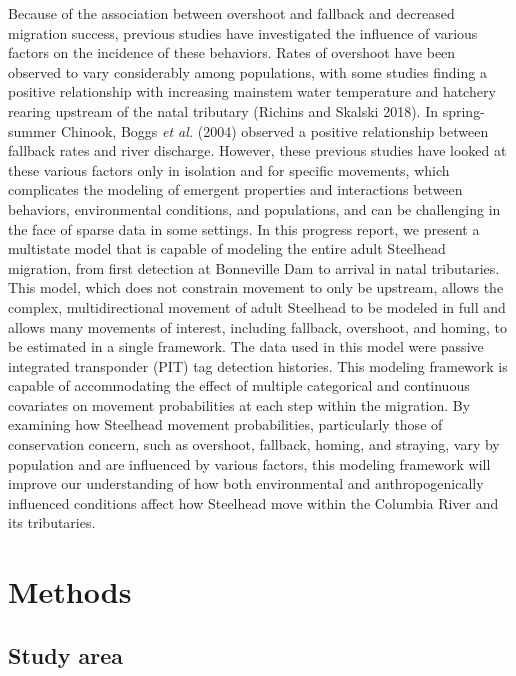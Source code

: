 \documentclass[
  12pt,
]{report}
\begin{document}
Because of the association between overshoot and fallback and decreased
migration success, previous studies have investigated the influence of
various factors on the incidence of these behaviors. Rates of overshoot
have been observed to vary considerably among populations, with some
studies finding a positive relationship with increasing mainstem water
temperature and hatchery rearing upstream of the natal tributary
(Richins and Skalski 2018). In spring-summer Chinook, Boggs \emph{et
al.} (2004) observed a positive relationship between fallback rates and
river discharge. However, these previous studies have looked at these
various factors only in isolation and for specific movements, which
complicates the modeling of emergent properties and interactions between
behaviors, environmental conditions, and populations, and can be
challenging in the face of sparse data in some settings. In this
progress report, we present a multistate model that is capable of
modeling the entire adult Steelhead migration, from first detection at
Bonneville Dam to arrival in natal tributaries. This model, which does
not constrain movement to only be upstream, allows the complex,
multidirectional movement of adult Steelhead to be modeled in full and
allows many movements of interest, including fallback, overshoot, and
homing, to be estimated in a single framework. The data used in this
model were passive integrated transponder (PIT) tag detection histories.
This modeling framework is capable of accommodating the effect of
multiple categorical and continuous covariates on movement probabilities
at each step within the migration. By examining how Steelhead movement
probabilities, particularly those of conservation concern, such as
overshoot, fallback, homing, and straying, vary by population and are
influenced by various factors, this modeling framework will improve our
understanding of how both environmental and anthropogenically influenced
conditions affect how Steelhead move within the Columbia River and its
tributaries.

\hypertarget{methods}{%
\chapter{Methods}\label{methods}}

\hypertarget{study-area}{%
\section{Study area}\label{study-area}}
\end{document}
